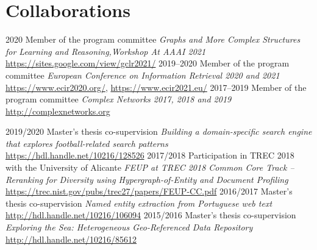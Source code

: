 \documentclass{friggeri-cv}
\begin{document}
\section{Collaborations}

\begin{entrylist}
\entry
{2020}
{Member of the program committee}
{}
{\emph{Graphs and More Complex Structures for Learning and Reasoning,\newline Workshop At AAAI 2021}\\
{\small\url{https://sites.google.com/view/gclr2021/}}}
\entry
{2019--2020}
{Member of the program committee}
{}
{\emph{European Conference on Information Retrieval 2020 and 2021}\\
{\small\url{https://www.ecir2020.org/}, \url{https://www.ecir2021.eu/}}}
\entry
{2017--2019}
{Member of the program committee}
{}
{\emph{Complex Networks 2017, 2018 and 2019}\\
{\small\url{http://complexnetworks.org}}}
\end{entrylist}
\begin{entrylist}
\entry
{2019/2020}
{Master's thesis co-supervision}
{}
{\emph{Building a domain-specific search engine that explores football-related search patterns}\\
{\small\url{https://hdl.handle.net/10216/128526}}}
\entry
{2017/2018}
{Participation in TREC 2018 with the University of Alicante}
{}
{\emph{FEUP at TREC 2018 Common Core Track -- Reranking for Diversity using Hypergraph-of-Entity and Document Profiling}\\
{\small\url{https://trec.nist.gov/pubs/trec27/papers/FEUP-CC.pdf}}}
\entry
{2016/2017}
{Master's thesis co-supervision}
{}
{\emph{Named entity extraction from Portuguese web text}\\
{\small\url{http://hdl.handle.net/10216/106094}}}
\entry
{2015/2016}
{Master's thesis co-supervision}
{}
{\emph{Exploring the Sea: Heterogeneous Geo-Referenced Data Repository}\\
{\small\url{http://hdl.handle.net/10216/85612}}}
\end{entrylist}

\end{document}
